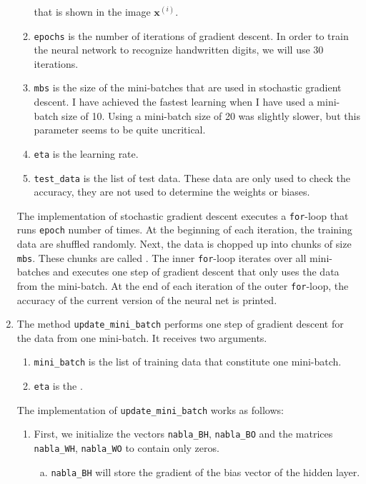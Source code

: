\begin{enumerate}
\begin{enumerate}
            that is shown in the image $\mathbf{x}^{(i)}$.
      \item \texttt{epochs} is the number of iterations of gradient descent.  In order to train the neural network to
            recognize handwritten digits, we will use 30 iterations.
      \item \texttt{mbs} is the size of the mini-batches that are used in stochastic gradient descent.
            I have achieved the fastest learning when I have used a mini-batch size of 10.  Using a mini-batch size
            of 20 was slightly slower, but this parameter seems to be quite uncritical.
      \item \texttt{eta} is the learning rate.
      \item \texttt{test\_data} is the list of test data.  These data are only used to check the accuracy, they are
            not used to determine the weights or biases.
      \end{enumerate}
      The implementation of stochastic gradient descent executes a \texttt{for}-loop that runs \texttt{epoch} number
      of times.  At the beginning of each iteration, the training data are shuffled randomly.  Next, the data is
      chopped up into chunks of size \texttt{mbs}.  These chunks are called .  The inner
      \texttt{for}-loop iterates over all mini-batches and executes one step of gradient descent that only uses the
      data from the mini-batch.  At the end of each iteration of the outer \texttt{for}-loop, the accuracy of the
      current version of the neural net is printed.
\item The method \texttt{update\_mini\_batch} performs one step of gradient descent for the data from one mini-batch.
      It receives two arguments.
      \begin{enumerate}
      \item \texttt{mini\_batch} is the list of training data that constitute one mini-batch.
      \item \texttt{eta} is the .
      \end{enumerate}
      The implementation of \texttt{update\_mini\_batch} works as follows:
      \begin{enumerate}
      \item First, we initialize the vectors \texttt{nabla\_BH}, \texttt{nabla\_BO} and the matrices
            \texttt{nabla\_WH}, \texttt{nabla\_WO} to contain only zeros.
            \begin{enumerate}[(a)]
            \item \texttt{nabla\_BH} will store the gradient of the bias vector of the hidden layer.

\end{enumerate}
\end{enumerate}
\end{enumerate}
